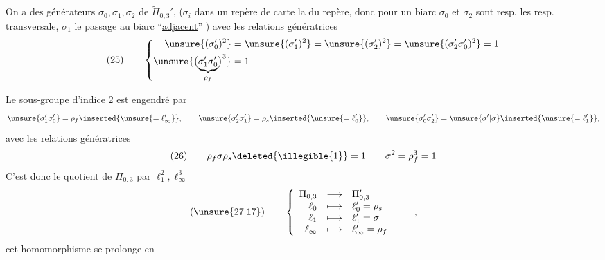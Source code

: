 On a des  générateurs  $\sigma_0,\sigma_1,\sigma_2$ de $\widetilde{\Pi}_{0,3}'$,
($\sigma_i$ dans un repère de carte  la  du repère, donc pour un biarc $\sigma_0$ et $\sigma_2$ sont resp. les   resp. transversale, $\sigma_1$ le passage au biarc ``\uline{adjacent}''
) avec les relations génératrices
\[
(25)\qquad
\left\{\begin{aligned}
\unsure{(\sigma_0')^2}&=\unsure{(\sigma_1')^2}=\unsure{(\sigma_2')^2}
=\unsure{(\sigma_2'\sigma_0')^2}=1\\
\unsure{\bigl(\underbrace{\sigma_1'\sigma_0'}_{\rho_f}\bigr)^3}&=1
\end{aligned}\right.
\]


Le sous-groupe  d'indice 2  est engendré par
\[
\unsure{\sigma_1'\sigma_0'}=\rho_f\inserted{\unsure{=\ell_\infty'}},\qquad
\unsure{\sigma_2'\sigma_1'}=\rho_s\inserted{\unsure{=\ell_0'}},\qquad
\unsure{\sigma_0'\sigma_2'}=\unsure{\sigma'|\sigma}\inserted{\unsure{=\ell_1'}},
\]
avec les relations génératrices
\[
(26)\qquad
\rho_f\sigma\rho_s\deleted{\illegible{1}}=1
\qquad
\sigma^2=\rho_f^3=1
\]
C'est donc le quotient de $\Pi_{0,3}$ par $\ell_1^2,\ell_\infty^3$
\[
(\unsure{27|17})\qquad
\left\{\begin{array}{rcl}
\Pi_{0,3}&\longrightarrow&\Pi_{0,3}'\\
\ell_0&\longmapsto&\ell_0'=\rho_s\\
\ell_1&\longmapsto&\ell_1'=\sigma\\
\ell_\infty&\longmapsto&\ell_\infty'=\rho_f
\end{array}\right.
\qquad,
\]
 cet homomorphisme se prolonge en


